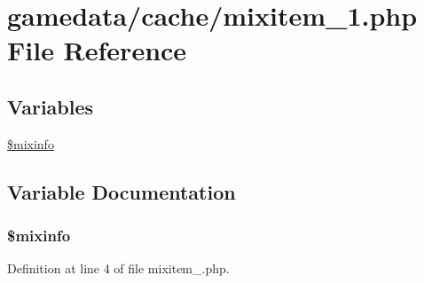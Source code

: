 \hypertarget{cache_2mixitem__1_8php}{\section{gamedata/cache/mixitem\+\_\+1.php File Reference}
\label{cache_2mixitem__1_8php}
}
\subsection*{Variables}
\begin{DoxyCompactItemize}
\item 
\hyperlink{cache_2mixitem__1_8php_af760ceec3cca51f1e5947afbbd300d36}{\$mixinfo}
\end{DoxyCompactItemize}


\subsection{Variable Documentation}
\hypertarget{cache_2mixitem__1_8php_af760ceec3cca51f1e5947afbbd300d36}{
\subsubsection[{\$mixinfo}]{\setlength{\rightskip}{0pt plus 5cm}\$mixinfo}}\label{cache_2mixitem__1_8php_af760ceec3cca51f1e5947afbbd300d36}


Definition at line 4 of file mixitem\+\_.\+php.

